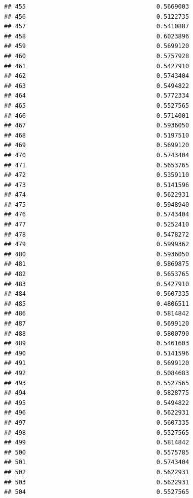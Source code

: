 \documentclass[
  american,
  man,floatsintext]{apa7}
\begin{document}
\begin{verbatim}
## 455                                    0.5669003
## 456                                    0.5122735
## 457                                    0.5410887
## 458                                    0.6023896
## 459                                    0.5699120
## 460                                    0.5757928
## 461                                    0.5427910
## 462                                    0.5743404
## 463                                    0.5494822
## 464                                    0.5772334
## 465                                    0.5527565
## 466                                    0.5714001
## 467                                    0.5936050
## 468                                    0.5197510
## 469                                    0.5699120
## 470                                    0.5743404
## 471                                    0.5653765
## 472                                    0.5359110
## 473                                    0.5141596
## 474                                    0.5622931
## 475                                    0.5948940
## 476                                    0.5743404
## 477                                    0.5252410
## 478                                    0.5478272
## 479                                    0.5999362
## 480                                    0.5936050
## 481                                    0.5869875
## 482                                    0.5653765
## 483                                    0.5427910
## 484                                    0.5607335
## 485                                    0.4806511
## 486                                    0.5814842
## 487                                    0.5699120
## 488                                    0.5800790
## 489                                    0.5461603
## 490                                    0.5141596
## 491                                    0.5699120
## 492                                    0.5084683
## 493                                    0.5527565
## 494                                    0.5828775
## 495                                    0.5494822
## 496                                    0.5622931
## 497                                    0.5607335
## 498                                    0.5527565
## 499                                    0.5814842
## 500                                    0.5575785
## 501                                    0.5743404
## 502                                    0.5622931
## 503                                    0.5622931
## 504                                    0.5527565

\end{verbatim}
\end{document}
